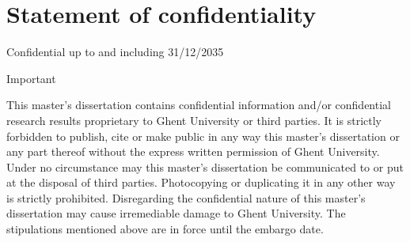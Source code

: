 \chapter*{Statement of confidentiality}

Confidential up to and including 31/12/2035

Important

This master’s dissertation contains confidential information and/or confidential research results proprietary to Ghent University or third parties. It is strictly forbidden to publish, cite or make public in any way this master’s dissertation or any part thereof without the express written permission of Ghent University. Under no circumstance may this master’s dissertation be communicated to or put at the disposal of third parties. Photocopying or duplicating it in any other way is strictly prohibited. Disregarding the confidential nature of this master’s dissertation may cause irremediable damage to Ghent University. The stipulations mentioned above are in force until the embargo date.